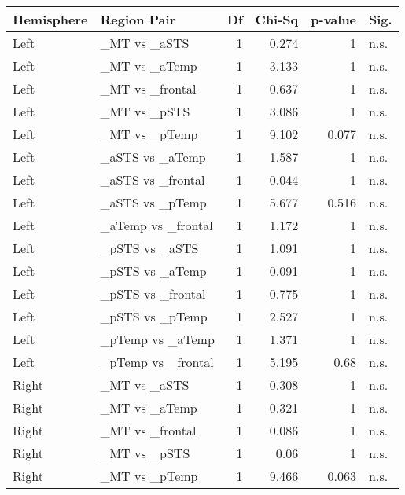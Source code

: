 \begin{table}[h]
\centering
\begin{tabular}{llrrrl}
\toprule
 Hemisphere   & Region Pair        &   Df &   Chi-Sq &   p-value & Sig.   \\
\midrule
 Left         & \_MT vs \_aSTS       &    1 &    0.274 &     1     & n.s.   \\
 Left         & \_MT vs \_aTemp      &    1 &    3.133 &     1     & n.s.   \\
 Left         & \_MT vs \_frontal    &    1 &    0.637 &     1     & n.s.   \\
 Left         & \_MT vs \_pSTS       &    1 &    3.086 &     1     & n.s.   \\
 Left         & \_MT vs \_pTemp      &    1 &    9.102 &     0.077 & n.s.   \\
 Left         & \_aSTS vs \_aTemp    &    1 &    1.587 &     1     & n.s.   \\
 Left         & \_aSTS vs \_frontal  &    1 &    0.044 &     1     & n.s.   \\
 Left         & \_aSTS vs \_pTemp    &    1 &    5.677 &     0.516 & n.s.   \\
 Left         & \_aTemp vs \_frontal &    1 &    1.172 &     1     & n.s.   \\
 Left         & \_pSTS vs \_aSTS     &    1 &    1.091 &     1     & n.s.   \\
 Left         & \_pSTS vs \_aTemp    &    1 &    0.091 &     1     & n.s.   \\
 Left         & \_pSTS vs \_frontal  &    1 &    0.775 &     1     & n.s.   \\
 Left         & \_pSTS vs \_pTemp    &    1 &    2.527 &     1     & n.s.   \\
 Left         & \_pTemp vs \_aTemp   &    1 &    1.371 &     1     & n.s.   \\
 Left         & \_pTemp vs \_frontal &    1 &    5.195 &     0.68  & n.s.   \\
 Right        & \_MT vs \_aSTS       &    1 &    0.308 &     1     & n.s.   \\
 Right        & \_MT vs \_aTemp      &    1 &    0.321 &     1     & n.s.   \\
 Right        & \_MT vs \_frontal    &    1 &    0.086 &     1     & n.s.   \\
 Right        & \_MT vs \_pSTS       &    1 &    0.06  &     1     & n.s.   \\
 Right        & \_MT vs \_pTemp      &    1 &    9.466 &     0.063 & n.s.   \\

\end{tabular}
\end{table}
